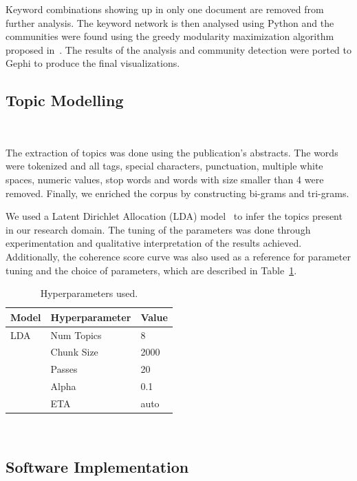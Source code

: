 \documentclass[parskip=full]{scrartcl}
\begin{document}
Keyword combinations showing up in only one document are removed from further
analysis. The keyword network is then analysed using Python and the
communities were found using the greedy modularity maximization algorithm
proposed in~\cite{Clauset2004}. The results of the analysis and community
detection were ported to Gephi to produce the final visualizations.

\subsection{Topic Modelling}~\label{sec:topic_modelling}

The extraction of topics was done using the publication's abstracts. The words
were tokenized and all tags, special characters, punctuation, multiple white
spaces, numeric values, stop words and words with size smaller than 4 were
removed. Finally, we enriched the corpus by constructing bi-grams and
tri-grams.

We used a Latent Dirichlet Allocation (LDA) model~\cite{Pritchard2000} to
infer the topics present in our research domain. The tuning of the parameters
was done through experimentation and qualitative interpretation of the results
achieved. Additionally, the coherence score curve was also used as a reference for
parameter tuning and the choice of parameters, which are described in
Table~\ref{tab:hyperparameters}. 

\begin{table}[H]
    \centering
    \begin{tabular}{lll}
        \toprule
        Model   &   Hyperparameter  &   Value \\
        \midrule
        LDA     &   Num Topics      &   8     \\
                &   Chunk Size      &   2000  \\
                &   Passes          &   20    \\
                &   Alpha           &   0.1   \\
                &   ETA             &   auto  \\
        \bottomrule
    \end{tabular}
    \caption{Hyperparameters used.}~\label{tab:hyperparameters}
\end{table}

\subsection{Software Implementation}~\label{sec:software_implementation}
\end{document}
